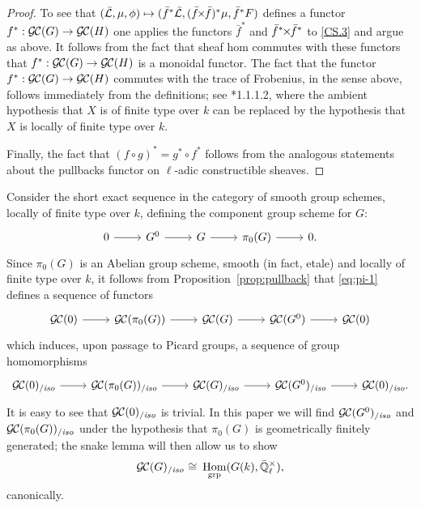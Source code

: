 \documentclass[11pt]{amsart}
\theoremstyle{plain}
\theoremstyle{definition}
\theoremstyle{remark}
\newcommand{\EE}{\mathbb{\bar Q}_\ell}
\newcommand{\Fq}{k}
\DeclareMathOperator{\Hom}{Hom}
\newcommand{\iso}{{\ \cong\ }}
\newcommand{\gcs}[1]{{\mathcal{\bar #1}}}
\newcommand{\GC}{{\mathcal{G\hskip-0.8pt C}}}
\newcommand{\GCiso}[1]{\GC(#1)_{/\textit{iso}}}
\renewcommand{\bf}{\bar{f}}
\newcommand{\tight}[3]{\hspace{-#1pt}{#2}\hspace{-#3pt}}
\newcommand{\bfxf}{\text{$\bar{f} \tight{1}{\times}{1} \bar{f}$}}
\newcommand\David[1]{\marginpar{\smaller\smaller DR: #1}}
\begin{document}
\begin{proof}
  To see that $(\gcs{L},\mu,\phi) \mapsto (\bf^*\gcs{L},(\bfxf)^*\mu,\bf^*F)$
  defines a functor $f^* : \GC(G) \to \GC(H)$ one applies the functors $\bf^*$ and
  $\bf^*\tight{1}{\times}{1}\bf^*$ to \ref{CS.3} and argue as
  above. It follows from the fact that sheaf hom commutes with these
  functors that $f^* : \GC(G) \to \GC(H)$ is a monoidal functor.
%
  The fact that the functor $f^* : \GC(G) \to \GC(H)$ commutes with
  the trace of Frobenius, in the sense above, follows immediately from
  the definitions; see \cite{Laumon}*{1.1.1.2}, where the ambient
  hypothesis that $X$ is of finite type over $\Fq$ can be replaced by
  the hypothesis that $X$ is locally of finite type over $\Fq$.
  
  Finally, the fact that $(f\circ g)^* = g^* \circ f^*$ follows from the analogous
  statements about the pullbacks functor on $\ell$-adic constructible sheaves.
\end{proof}

Consider the short exact sequence in the category of smooth group
schemes, locally of finite type over $\Fq$, defining the component
group scheme for $G$:
\begin{equation}\label{eq:pi-2}
\begin{tikzcd}
0 \rar & G^0 \rar & G \rar & \pi_0(G) \rar & 0.
\end{tikzcd}
\end{equation}
Since $\pi_0(G)$ is an Abelian group scheme, smooth (in fact, etale) and locally of finite type over $\Fq$, 
it follows from Proposition~\ref{prop:pullback} that \eqref{eq:pi-1} defines a sequence of functors
\[
\begin{tikzcd}
\GC(0) \rar & \GC(\pi_0(G)) \rar & \GC(G) \rar & \GC(G^0) \rar & \GC(0)
\end{tikzcd}
\]
which induces, upon passage to Picard groups, a sequence of group homomorphisms 
\begin{equation}\label{eq:pi-1}
\begin{tikzcd}
\GCiso{0} \rar & \GCiso{\pi_0(G)} \rar & \GCiso{G} \rar & \GCiso{G^0} \rar & \GCiso{0}.
\end{tikzcd}
\end{equation}
It is easy to see that $\GCiso{0}$ is trivial. In this paper we will find $\GCiso{G^0}$ and $\GCiso{\pi_0(G)}$ under the hypothesis that $\pi_0(G)$ is geometrically finitely generated; 
the snake lemma will then allow us to show
\[
\GCiso{G} \iso \Hom_\text{grp}(G(\Fq),\EE^\times),
\]
canonically.
\end{document}
